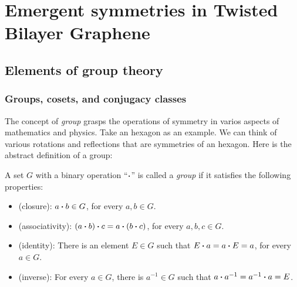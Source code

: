



\chapter{Emergent symmetries in Twisted Bilayer Graphene}

\section{Elements of group theory}

\subsection{Groups, cosets, and conjugacy classes}

The concept of \textit{group} grasps the operations of symmetry in varios aspects of mathematics and physics. Take an hexagon as an example. We can think of various rotations and reflections that are symmetries of an hexagon. Here is the abstract definition of a group:

A set $G$ with a binary operation ``$\vdot$'' is called a \textit{group} if it satisfies the following properties:
\begin{itemize}
\item (closure): $a \vdot b \in G$, for every $a, b \in G$.
\item (associativity): $(a \vdot b) \vdot c =  a \vdot (b \vdot c)$, for every $a, b, c \in G$.
\item (identity): There is an element $E \in G$ such that $E \vdot a = a \vdot E = a$, for every $a \in G$.
\item (inverse): For every $a \in G$, there is $a^{-1} \in G$ such that $a \vdot a^{-1} = a^{-1} \vdot a = E$.
\end{itemize}

